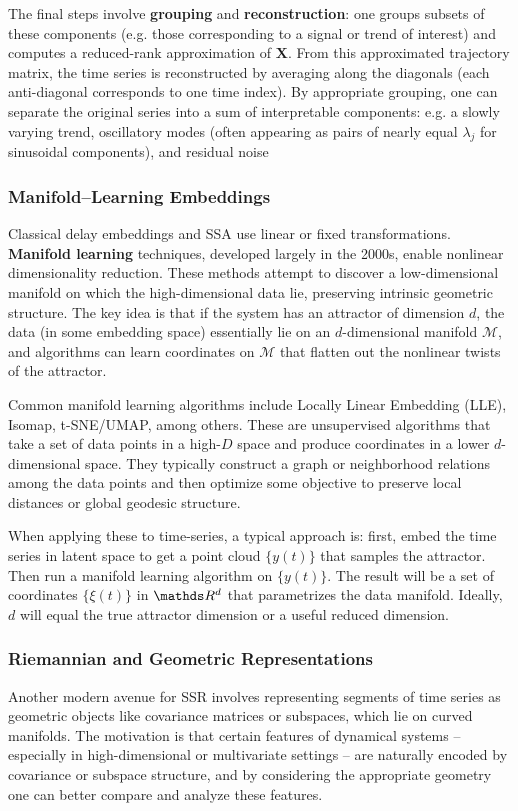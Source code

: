 \documentclass[14pt]{extarticle}
\begin{document}
	The final steps involve \textbf{grouping} and \textbf{reconstruction}: one groups subsets of these components (e.g. those corresponding to a signal or trend of interest) and computes a reduced-rank approximation of $\mathbf{X}$. From this approximated trajectory matrix, the time series is reconstructed by averaging along the diagonals (each anti-diagonal corresponds to one time index).
	By appropriate grouping, one can separate the original series into a sum of interpretable components: e.g. a slowly varying trend, oscillatory modes (often appearing as pairs of nearly equal $\lambda_j$ for sinusoidal components), and residual noise
	
	\subsubsection*{Manifold–Learning Embeddings}
	
	Classical delay embeddings and SSA use linear or fixed transformations. \textbf{Manifold learning} techniques, developed largely in the 2000s, enable nonlinear dimensionality reduction. 
	These methods attempt to discover a low-dimensional manifold on which the high-dimensional data lie, preserving intrinsic geometric structure.
	The key idea is that if the system has an attractor of dimension $d$, the data (in some embedding space) essentially lie on an $d$-dimensional manifold $\mathcal{M}$, and algorithms can learn coordinates on $\mathcal{M}$ that flatten out the nonlinear twists of the attractor.
	
	Common manifold learning algorithms include Locally Linear Embedding (LLE), Isomap, t-SNE/UMAP, among others.
	These are unsupervised algorithms that take a set of data points in a high-$D$ space and produce coordinates in a lower $d$-dimensional space.
	They typically construct a graph or neighborhood relations among the data points and then optimize some objective to preserve local distances or global geodesic structure.
	
	When applying these to time-series, a typical approach is: first, embed the time series in latent space to get a point cloud $\{y(t)\}$ that samples the attractor.
	Then run a manifold learning algorithm on $\{y(t)\}$.
	The result will be a set of coordinates $\{\xi(t)\}$ in $\dR^d$ that parametrizes the data manifold.
	Ideally, $d$ will equal the true attractor dimension or a useful reduced dimension.
	
	\subsubsection*{Riemannian and Geometric Representations}
	Another modern avenue for SSR involves representing segments of time series as geometric objects like covariance matrices or subspaces, which lie on curved manifolds. 
	The motivation is that certain features of dynamical systems -- especially in high-dimensional or multivariate settings -- are naturally encoded by covariance or subspace structure, and by considering the appropriate geometry one can better compare and analyze these features.
	
\end{document}

